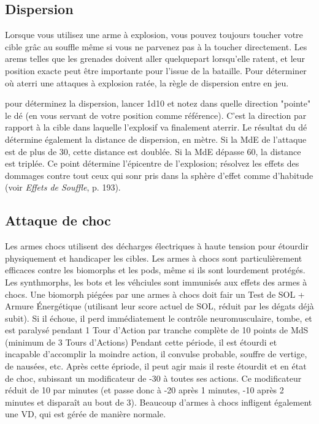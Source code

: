 \subsection{Dispersion} \label{sec:scatter} 

Lorsque vous utilisez une arme à explosion, vous pouvez toujours toucher votre cible grâc au souffle même si vous ne parvenez pas à la toucher directement. Les arems telles que les grenades doivent aller quelquepart lorsqu'elle ratent, et leur position exacte peut être importante pour l'issue de la bataille. Pour déterminer où aterri une attaques à explosion ratée, la règle de dispersion entre en jeu. 

pour déterminez la dispersion, lancer 1d10 et notez dans quelle direction "pointe" le dé (en vous servant de votre position comme référence). C'est la direction par rapport à la cible dans laquelle l'explosif va finalement aterrir. Le résultat du dé détermine également la distance de dispersion, en mètre. Si la MdE de l'attaque est de plus de 30, cette distance est doublée. Si la MdE dépasse 60, la distance est triplée. Ce point détermine l'épicentre de l'explosion; résolvez les effets des dommages contre tout ceux qui sonr pris dans la sphère d'effet comme d'habitude (voir \emph{Effets de Souffle}, p. 193). 



\subsection{Attaque de choc} \label{sec:shock-attacks} 

Les armes chocs utilisent des décharges électriques à haute tension pour étourdir physiquement et handicaper les cibles. Les armes à chocs sont particulièrement efficaces contre les biomorphs et les pods, même si ils sont lourdement protégés. Les synthmorphs, les bots et les véhciules sont immunisés aux effets des armes à chocs. Une biomorph piégées par une armes à chocs doit fair un Test de SOL + Armure Énergétique (utilisant leur score actuel de SOL, réduit par les dégats déjà subit). Si il échoue, il perd immédiatement le contrôle neuromusculaire, tombe, et est paralysé pendant 1 Tour d'Action par tranche complète de 10 points de MdS (minimum de 3 Tours d'Actions) Pendant cette période, il est étourdi et incapable d'accomplir la moindre action, il convulse probable, souffre de vertige, de nausées, etc. Après cette épriode, il peut agir mais il reste étourdit et en état de choc, subissant un modificateur de -30 à toutes ses actions. Ce modificateur réduit de 10 par minutes (et passe donc à -20 après 1 minutes, -10 après 2 minutes et disparaît au bout de 3). Beaucoup d'armes à chocs infligent également une VD, qui est gérée de manière normale. 

